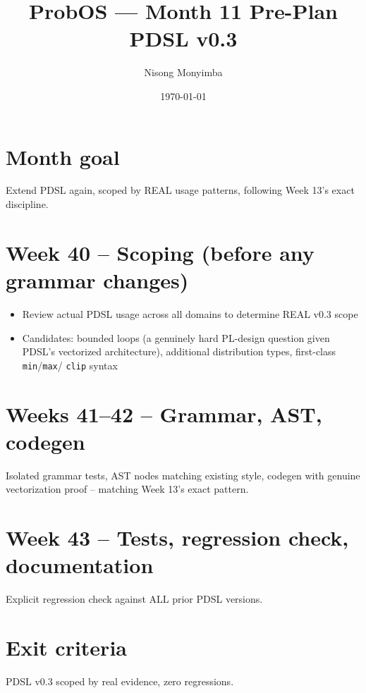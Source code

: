 \documentclass[11pt]{article}
\title{ProbOS --- Month 11 Pre-Plan\\PDSL v0.3}
\author{Nisong Monyimba}
\date{\today}
\begin{document}
\maketitle

\section*{Month goal}
Extend PDSL again, scoped by REAL usage patterns, following Week 13's
exact discipline.

\section*{Week 40 -- Scoping (before any grammar changes)}
\begin{itemize}[leftmargin=*]
  \item Review actual PDSL usage across all domains to determine REAL
    v0.3 scope
  \item Candidates: bounded loops (a genuinely hard PL-design
    question given PDSL's vectorized architecture), additional
    distribution types, first-class \texttt{min}/\texttt{max}/
    \texttt{clip} syntax
\end{itemize}

\section*{Weeks 41--42 -- Grammar, AST, codegen}
Isolated grammar tests, AST nodes matching existing style, codegen
with genuine vectorization proof -- matching Week 13's exact pattern.

\section*{Week 43 -- Tests, regression check, documentation}
Explicit regression check against ALL prior PDSL versions.

\section*{Exit criteria}
PDSL v0.3 scoped by real evidence, zero regressions.
\end{document}
